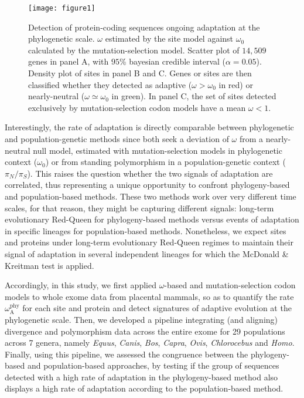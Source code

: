 \documentclass[9pt,twocolumn,twoside,lineno]{pnas-new}
\newcommand{\rateApop}{\omega_{\mathrm{A}}}
\newcommand{\rateAphy}{\rateApop^{\mathrm{phy}}}
\newcommand{\pn}{\pi_N}
\newcommand{\ps}{\pi_S}
\newcommand{\pnps}{\pn / \ps}
\begin{document}
\begin{figure*}[b]
       \centering
       \texttt{[image: figure1]}
       \caption{
              Detection of protein-coding sequences ongoing adaptation at the phylogenetic scale.
              $\omega$ estimated by the site model against $\omega_{0}$ calculated by the mutation-selection model.
              Scatter plot of $14,509$ genes in panel A, with $95$\% bayesian credible interval ($\alpha=0.05$).
              Density plot of sites in panel B and C.
              Genes or sites are then classified whether they detected as adaptive ($\omega > \omega_{0}$ in red) or nearly-neutral ($\omega \simeq \omega_{0}$ in green).
              In panel C, the set of sites detected exclusively by mutation-selection codon models have a mean $\omega < 1 $.}
       \label{fig:scatterplot}
\end{figure*}

Interestingly, the rate of adaptation is directly comparable between phylogenetic and population-genetic methods since both seek a deviation of $\omega$  from a nearly-neutral null model, estimated with mutation-selection models in phylogenetic context ($\omega_{0}$) or from standing polymorphism in a population-genetic context ($\pnps$).
This raises the question whether the two signals of adaptation are correlated, thus representing a unique opportunity to confront phylogeny-based and population-based methods.
These two methods work over very different time scales, for that reason, they might be capturing different signals: long-term evolutionary Red-Queen for phylogeny-based methods versus events of adaptation in specific lineages for population-based methods.
Nonetheless, we expect sites and proteins under long-term evolutionary Red-Queen regimes to maintain their signal of adaptation in several independent lineages for which the McDonald \& Kreitman test is applied.

Accordingly, in this study, we first applied $\omega$-based and mutation-selection codon models to whole exome data from placental mammals, so as to quantify the rate $\rateAphy$ for each site and protein and detect signatures of adaptive evolution at the phylogenetic scale.
Then, we developed a pipeline integrating (and aligning) divergence and polymorphism data across the entire exome for 29 populations across 7 genera, namely \textit{Equus}, \textit{Canis}, \textit{Bos}, \textit{Capra}, \textit{Ovis}, \textit{Chlorocebus} and \textit{Homo}.
Finally, using this pipeline, we assessed the congruence between the phylogeny-based and population-based approaches, by testing if the group of sequences detected with a high rate of adaptation in the phylogeny-based method also displays a high rate of adaptation according to the population-based method.
\end{document}
